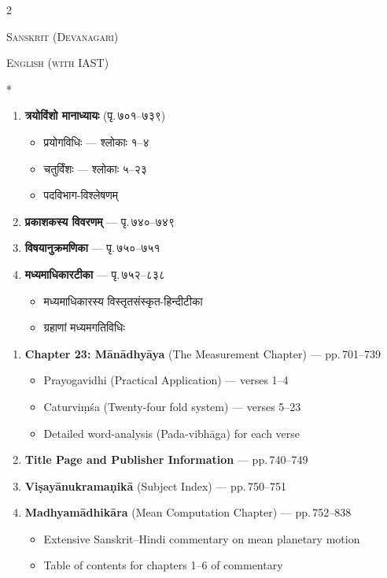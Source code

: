 \documentclass[11pt,a4paper]{article}
\newcommand{\dev}[1]{{\devanagarifont #1}}
\newcommand{\sanskritlabel}{\begin{center}\textcolor{sectioncolor}{\small\textsc{Sanskrit (Devanagari)}}\end{center}}
\newcommand{\englishlabel}{\begin{center}\textcolor{sectioncolor}{\small\textsc{English (with IAST)}}\end{center}}
\begin{document}
\begin{paracol}{2}
\sanskritlabel
\englishlabel
\switchcolumn[0]*

\begin{enumerate}[label=\dev{\arabic*.},leftmargin=*]
  \item \textbf{\dev{त्रयोविंशो मानाध्यायः}} (पृ.\,७०१--७३९)
  \begin{itemize}[label=\textendash,leftmargin=1em]
    \item \dev{प्रयोगविधिः} — श्लोकाः १--४
    \item \dev{चतुर्विंशः} — श्लोकाः ५--२३
    \item \dev{पदविभाग-विश्लेषणम्}
  \end{itemize}
  \item \textbf{\dev{प्रकाशकस्य विवरणम्}} — पृ.\,७४०--७४९
  \item \textbf{\dev{विषयानुक्रमणिका}} — पृ.\,७५०--७५१
  \item \textbf{\dev{मध्यमाधिकारटीका}} — पृ.\,७५२--८३८
  \begin{itemize}[label=\textendash,leftmargin=1em]
    \item \dev{मध्यमाधिकारस्य विस्तृतसंस्कृत-हिन्दीटीका}
    \item \dev{ग्रहाणां मध्यमगतिविधिः}
  \end{itemize}
\end{enumerate}

\switchcolumn

\begin{enumerate}[label=\arabic*.,leftmargin=*]
  \item \textbf{Chapter 23: Mānādhyāya} (The Measurement Chapter) — pp.\,701--739
  \begin{itemize}[label=\textendash,leftmargin=1em]
    \item Prayogavidhi (Practical Application) — verses 1--4
    \item Caturviṃśa (Twenty-four fold system) — verses 5--23
    \item Detailed word-analysis (Pada-vibhāga) for each verse
  \end{itemize}
  \item \textbf{Title Page and Publisher Information} — pp.\,740--749
  \item \textbf{Viṣayānukramaṇikā} (Subject Index) — pp.\,750--751
  \item \textbf{Madhyamādhikāra} (Mean Computation Chapter) — pp.\,752--838
  \begin{itemize}[label=\textendash,leftmargin=1em]
    \item Extensive Sanskrit–Hindi commentary on mean planetary motion
    \item Table of contents for chapters 1--6 of commentary
  \end{itemize}
\end{enumerate}
\end{paracol}
\end{document}
